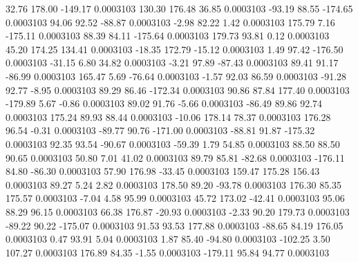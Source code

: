        32.76      178.00     -149.17     0.0003103
      130.30      176.48       36.85     0.0003103
      -93.19       88.55     -174.65     0.0003103
       94.06       92.52      -88.87     0.0003103
       -2.98       82.22        1.42     0.0003103
      175.79        7.16     -175.11     0.0003103
       88.39       84.11     -175.64     0.0003103
      179.73       93.81        0.12     0.0003103
       45.20      174.25      134.41     0.0003103
      -18.35      172.79      -15.12     0.0003103
        1.49       97.42     -176.50     0.0003103
      -31.15        6.80       34.82     0.0003103
       -3.21       97.89      -87.43     0.0003103
       89.41       91.17      -86.99     0.0003103
      165.47        5.69      -76.64     0.0003103
       -1.57       92.03       86.59     0.0003103
      -91.28       92.77       -8.95     0.0003103
       89.29       86.46     -172.34     0.0003103
       90.86       87.84      177.40     0.0003103
     -179.89        5.67       -0.86     0.0003103
       89.02       91.76       -5.66     0.0003103
      -86.49       89.86       92.74     0.0003103
      175.24       89.93       88.44     0.0003103
      -10.06      178.14       78.37     0.0003103
      176.28       96.54       -0.31     0.0003103
      -89.77       90.76     -171.00     0.0003103
      -88.81       91.87     -175.32     0.0003103
       92.35       93.54      -90.67     0.0003103
      -59.39        1.79       54.85     0.0003103
       88.50       88.50       90.65     0.0003103
       50.80        7.01       41.02     0.0003103
       89.79       85.81      -82.68     0.0003103
     -176.11       84.80      -86.30     0.0003103
       57.90      176.98      -33.45     0.0003103
      159.47      175.28      156.43     0.0003103
       89.27        5.24        2.82     0.0003103
      178.50       89.20      -93.78     0.0003103
      176.30       85.35      175.57     0.0003103
       -7.04        4.58       95.99     0.0003103
       45.72      173.02      -42.41     0.0003103
       95.06       88.29       96.15     0.0003103
       66.38      176.87      -20.93     0.0003103
       -2.33       90.20      179.73     0.0003103
      -89.22       90.22     -175.07     0.0003103
       91.53       93.53      177.88     0.0003103
      -88.65       84.19      176.05     0.0003103
        0.47       93.91        5.04     0.0003103
        1.87       85.40      -94.80     0.0003103
     -102.25        3.50      107.27     0.0003103
      176.89       84.35       -1.55     0.0003103
     -179.11       95.84       94.77     0.0003103
